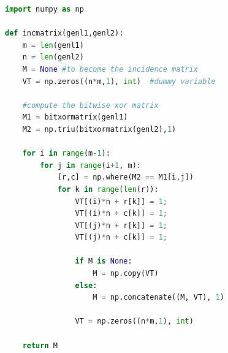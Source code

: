 \begin{lstlisting}[language=Python, caption={Python Code}, label={lst:pythonfile}]
import numpy as np

def incmatrix(genl1,genl2):
    m = len(genl1)
    n = len(genl2)
    M = None #to become the incidence matrix
    VT = np.zeros((n*m,1), int)  #dummy variable

    #compute the bitwise xor matrix
    M1 = bitxormatrix(genl1)
    M2 = np.triu(bitxormatrix(genl2),1)

    for i in range(m-1):
        for j in range(i+1, m):
            [r,c] = np.where(M2 == M1[i,j])
            for k in range(len(r)):
                VT[(i)*n + r[k]] = 1;
                VT[(i)*n + c[k]] = 1;
                VT[(j)*n + r[k]] = 1;
                VT[(j)*n + c[k]] = 1;

                if M is None:
                    M = np.copy(VT)
                else:
                    M = np.concatenate((M, VT), 1)

                VT = np.zeros((n*m,1), int)

    return M
\end{lstlisting}
